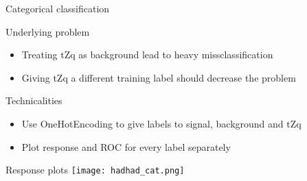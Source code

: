 \begin{frame}{Categorical classification}
    \begin{block}{Underlying problem}
        \begin{itemize}
            \item Treating tZq as background lead to heavy missclassification
            \item Giving tZq a different training label should decrease the problem
        \end{itemize}
    \end{block}
    \begin{block}{Technicalities}
        \begin{itemize}
            \item Use OneHotEncoding to give labels to signal, background and tZq
            \item Plot response and ROC for every label separately
        \end{itemize}
    \end{block}
\end{frame}

\begin{frame}{Response plots}
    \texttt{[image: hadhad\_cat.png]}
\end{frame}